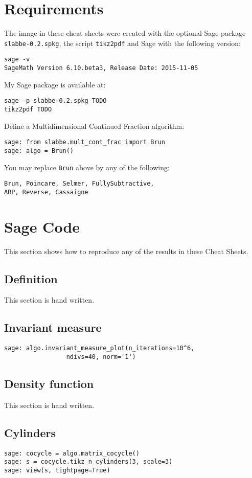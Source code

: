 \section{Requirements}
The image in these cheat sheets were created with the optional Sage package
\texttt{slabbe-0.2.spkg}, the script \texttt{tikz2pdf} and Sage with the
following version:
\begin{verbatim}
sage -v
SageMath Version 6.10.beta3, Release Date: 2015-11-05
\end{verbatim}
My Sage package is available at:
\begin{verbatim}
sage -p slabbe-0.2.spkg TODO
tikz2pdf TODO
\end{verbatim}
Define a Multidimensional Continued Fraction algorithm:
\begin{verbatim}
sage: from slabbe.mult_cont_frac import Brun
sage: algo = Brun()
\end{verbatim}
You may replace \texttt{Brun} above by any of the following:
\begin{verbatim}
Brun, Poincare, Selmer, FullySubtractive, 
ARP, Reverse, Cassaigne
\end{verbatim}
\section{Sage Code}
This section shows how to reproduce any of the results in these Cheat Sheets.
\subsection{Definition}
This section is hand written.
\subsection{Invariant measure}
\begin{verbatim}
sage: algo.invariant_measure_plot(n_iterations=10^6,
                 ndivs=40, norm='1')
\end{verbatim}
\subsection{Density function}
This section is hand written.
\subsection{Cylinders}
\begin{verbatim}
sage: cocycle = algo.matrix_cocycle()
sage: s = cocycle.tikz_n_cylinders(3, scale=3)
sage: view(s, tightpage=True)
\end{verbatim}
